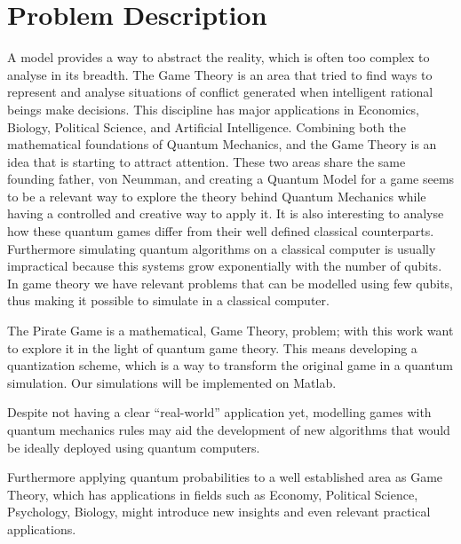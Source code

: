 \section{Problem Description}
\label{sec:int_problem}

A model provides a way to abstract the reality, which is often too complex to analyse in its breadth. The Game Theory is an area that tried to find ways to represent and analyse situations of conflict generated when intelligent rational beings make decisions. This discipline has major applications in Economics, Biology, Political Science, and Artificial Intelligence. 
Combining both the mathematical foundations of Quantum Mechanics, and the Game Theory is an idea that is starting to attract attention. These two areas share the same founding father, von Neumman, and creating a Quantum Model for a game seems to be a relevant way to explore the theory behind Quantum Mechanics while having a controlled and creative way to apply it. It is also interesting to analyse how these quantum games differ from their well defined classical counterparts. Furthermore  simulating quantum algorithms on a classical computer is usually impractical because this systems grow exponentially with the number of qubits. In game theory we have relevant problems that can be modelled using few qubits, thus making it possible to simulate in a classical computer.

The Pirate Game is a mathematical, Game Theory, problem; with this work want to explore it in the light of quantum game theory. This means developing a quantization scheme, which is a way to transform the original game in a quantum simulation. Our simulations will be implemented on Matlab.

Despite not having a clear ``real-world'' application yet, modelling games with quantum mechanics rules may aid the development of new algorithms that would be ideally deployed using quantum computers. 

Furthermore applying quantum probabilities to a well established area as Game Theory, which has applications in fields such as Economy, Political Science, Psychology, Biology, might introduce new insights and even relevant practical applications\cite{Eisert2008}. 




